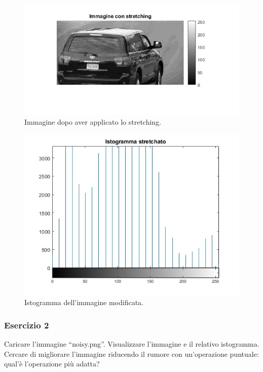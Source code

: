 \documentclass[a4paper]{article}
\newcommand{\dquotes}[1]{``#1''}
\begin{document}
	\begin{figure}[!htp]
		\centering
		\includegraphics[width=\textwidth]{img/lab/operatori_puntuali-3.jpg}
		\caption{Immagine dopo aver applicato lo stretching.}
	\end{figure}
	\begin{figure}[!htp]
		\centering
		\includegraphics[width=\textwidth]{img/lab/operatori_puntuali-4.jpg}
		\caption{Istogramma dell'immagine modificata.}
	\end{figure}\newpage
	
	\subsubsection{Esercizio 2}
	
	Caricare l'immagine \dquotes{\textsf{noisy.png}}. Visualizzare l'immagine e il relativo istogramma. Cercare di migliorare l'immagine riducendo il rumore con un'operazione puntuale: qual'è l'operazione più adatta?\newline
	
\end{document}
